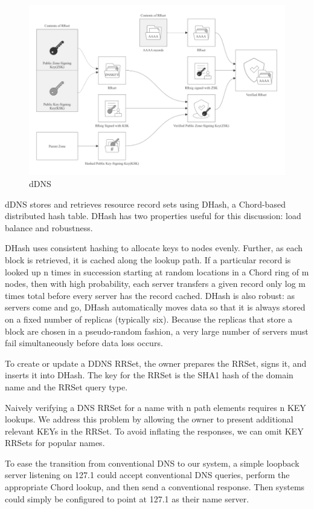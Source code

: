 \documentclass[twocolumn]{article}
\begin{document}
\begin{figure}[htbp]
  \includegraphics[width=\linewidth]{imgs/4.png}
  \caption{dDNS}
  \label{ddns}

  \end{figure}


dDNS stores and retrieves resource record sets using DHash, a Chord-based distributed hash table. DHash has two properties useful for this discussion: load balance and robustness.

DHash uses consistent hashing to allocate keys to nodes evenly. Further, as each block is retrieved, it is cached along the lookup path. If a particular record is looked up n times in succession starting at random locations in a Chord ring of m nodes, then with high probability, each server transfers a given record only log m times total before every server has the record cached.
DHash is also robust: as servers come and go, DHash automatically moves data so that it is always stored on a fixed number of replicas (typically six). Because the replicas that store a block are chosen in a pseudo-random fashion, a very large number of servers must fail simultaneously before data loss occurs.

To create or update a DDNS RRSet, the owner prepares the RRSet, signs it, and inserts it into DHash. The key for the RRSet is the SHA1 hash of the domain name and the RRSet query type.

Naively verifying a DNS RRSet for a name with n path elements requires n KEY lookups. We address this problem by allowing the owner to present additional relevant KEYs in the RRSet. To avoid inflating the responses, we can omit KEY RRSets for popular names.

To ease the transition from conventional DNS to our system, a simple loopback server listening on 127.1 could accept conventional DNS queries, perform the appropriate Chord lookup, and then send a conventional response. Then systems could simply be configured to point at 127.1 as their name server.
\end{document}
